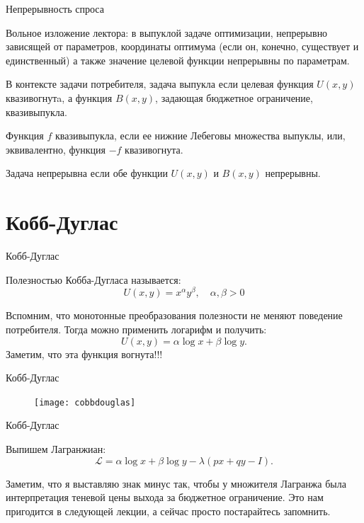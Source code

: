 \documentclass{beamer}
\begin{document}
\begin{frame}{Непрерывность спроса}

Вольное изложение лектора: \alert{в выпуклой задаче оптимизации, непрерывно зависящей от параметров, координаты оптимума (если он, конечно, существует и единственный) а также значение целевой функции непрерывны по параметрам.}

В контексте задачи потребителя, задача выпукла если целевая функция $U(x,y)$ квазивогнутa, а функция $B(x,y)$, задающая бюджетное ограничение, квазивыпукла. 

Функция $f$ \alert{квазивыпукла}, если ее нижние Лебеговы множества выпуклы, или, эквивалентно, функция $-f$ квазивогнута.

Задача непрерывна если обе функции $U(x,y)$ и $B(x,y)$ непрерывны.

\end{frame}

\section{Кобб-Дуглас}

\begin{frame}{Кобб-Дуглас}

\begin{definition}
Полезностью \alert{Кобба-Дугласа} называется:
$$U(x, y) = x^\alpha y^\beta, \quad \alpha, \beta > 0$$  
\end{definition}

Вспомним, что монотонные преобразования полезности не меняют поведение потребителя. Тогда можно применить логарифм и получить:
$$ U(x, y) = \alpha \log x + \beta \log y.$$ 
Заметим, что эта функция вогнута!!! 
\end{frame}

\begin{frame}{Кобб-Дуглас}

\begin{figure}[hbt]
\centering
\texttt{[image: cobbdouglas]}
\end{figure}

\end{frame}


\begin{frame}{Кобб-Дуглас}

Выпишем Лагранжиан:
$$ \mathcal{L} = \alpha \log x + \beta \log y - \lambda (px + qy -I).$$ 

Заметим, что я выставляю знак минус так, чтобы у множителя Лагранжа была интерпретация теневой цены выхода за бюджетное ограничение. Это нам пригодится в следующей лекции, а сейчас просто постарайтесь запомнить.
\end{frame}
\end{document}
